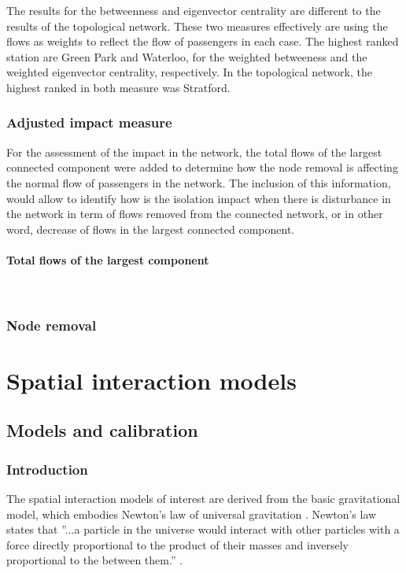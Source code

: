 \documentclass{article}
\begin{document}
The results for the betweenness and eigenvector centrality are different to the results of the topological network. These two measures effectively are using the flows as weights to reflect the flow of passengers in each case. The highest ranked station are Green Park and Waterloo, for the weighted betweeness and the weighted eigenvector centrality, respectively. In the topological network, the highest ranked in both measure was Stratford.

\subsubsection{Adjusted impact measure}

For the assessment of the impact in the network, the total flows of the largest connected component were added to determine how the node removal is affecting the normal flow of passengers in the network. The inclusion of this information, would allow to identify how is the isolation impact when there is disturbance in the network in term of flows removed from the connected network, or in other word, decrease of flows in the largest connected component.

\paragraph{Total flows of the largest component}\mbox{}\\



\subsubsection{Node removal}

\section{Spatial interaction models}


\subsection{Models and calibration}

\subsubsection{Introduction}

The spatial interaction models of interest are derived from the basic gravitational model, which embodies Newton's law of universal gravitation \citep{battyUrbanModellingAlgorithms1976}. Newton's law states that ''...a particle in the universe would interact with other particles with a force directly proportional to the product of their masses and inversely proportional to the between them.'' \citep{battyUrbanSimulationSpatial2023}.
\end{document}
